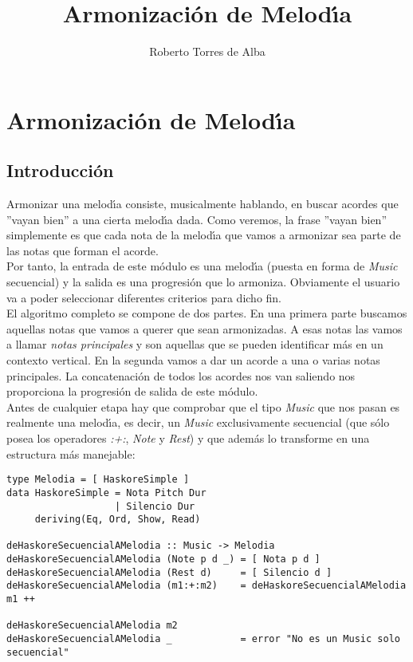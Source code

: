 \documentclass[a4paper]{report}
\title{Armonizaci\'on de Melod\'\i a}
\author{Roberto Torres de Alba}
\begin{document}
\tableofcontents

\chapter{Armonizaci\'on de Melod\'\i a}

\section{Introducci\'on}
Armonizar una melod\'\i a consiste, musicalmente hablando, en buscar
acordes que ''vayan bien'' a una cierta melod\'\i a dada. Como
veremos, la frase ''vayan bien'' simplemente es que cada nota
de la melod\'\i a que vamos a armonizar sea parte de las notas que forman el
acorde.\\
Por tanto, la entrada de este m\'odulo es una melod\'\i a (puesta en forma
de \emph{Music} secuencial) y la salida es una progresi\'on que lo armoniza.
Obviamente el usuario va a poder seleccionar diferentes criterios para
dicho fin.\\
\indent El algoritmo completo se compone de dos partes. En una primera parte
buscamos aquellas notas que vamos a querer que sean armonizadas. A esas
notas las vamos a llamar \emph{notas principales} y son aquellas que se pueden identificar
m\'as en un contexto vertical. En la segunda 
vamos a dar un acorde a una o varias notas principales. La concatenaci\'on
de todos los acordes nos van saliendo nos proporciona la progresi\'on de salida de este m\'odulo.\\
\indent Antes de cualquier etapa hay que comprobar que el tipo \emph{Music} que nos
pasan es realmente una melod\'\i a, es decir, un \emph{Music} exclusivamente 
secuencial (que s\'olo posea los operadores \emph{:+:}, \emph{Note} y \emph{Rest}) y que adem\'as
lo transforme en una estructura m\'as manejable:
\small
\begin{verbatim}
type Melodia = [ HaskoreSimple ]
data HaskoreSimple = Nota Pitch Dur
                   | Silencio Dur
     deriving(Eq, Ord, Show, Read)

deHaskoreSecuencialAMelodia :: Music -> Melodia
deHaskoreSecuencialAMelodia (Note p d _) = [ Nota p d ]
deHaskoreSecuencialAMelodia (Rest d)     = [ Silencio d ]
deHaskoreSecuencialAMelodia (m1:+:m2)    = deHaskoreSecuencialAMelodia m1 ++ 
                                                deHaskoreSecuencialAMelodia m2
deHaskoreSecuencialAMelodia _            = error "No es un Music solo secuencial"
\end{verbatim}
\normalsize
\end{document}
